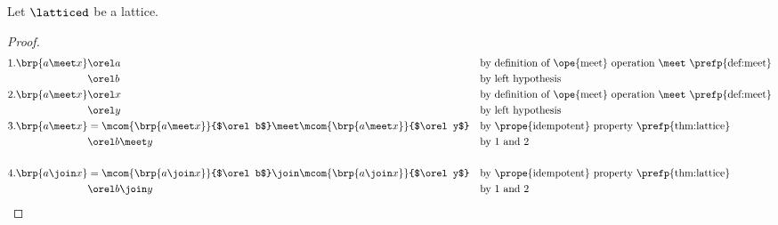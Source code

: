 \begin{proposition}
\label{prop:latmono}
Let $\latticed$ be a lattice.
\end{proposition}
\begin{proof}
\begin{align*}
  1. \brp{a \meet x}
    &\orel a
    && \text{by definition of \ope{meet} operation $\meet$ \prefp{def:meet}}
  \\&\orel b
    && \text{by left hypothesis}
  \\
  2. \brp{a \meet x}
    &\orel x
    && \text{by definition of \ope{meet} operation $\meet$ \prefp{def:meet}}
  \\&\orel y
    && \text{by left hypothesis}
  \\
  3. \brp{a \meet x}
    &= \mcom{\brp{a \meet x}}{$\orel b$} \meet \mcom{\brp{a \meet x}}{$\orel y$}
    && \text{by \prope{idempotent} property \prefp{thm:lattice}}
  \\&\orel b \meet y
    && \text{by 1 and 2}
  \\
  \\
  4. \brp{a \join x}
    &= \mcom{\brp{a \join x}}{$\orel b$} \join \mcom{\brp{a \join x}}{$\orel y$}
    && \text{by \prope{idempotent} property \prefp{thm:lattice}}
  \\&\orel b \join y
    && \text{by 1 and 2}
\end{align*}
\end{proof}


